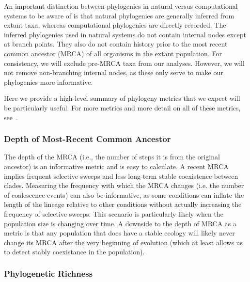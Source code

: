 \documentclass[letterpaper]{article}
\begin{document}
An important distinction between phylogenies in natural versus computational systems to be aware of is that natural phylogenies are generally inferred from extant taxa, whereas computational phylogenies are directly recorded. The inferred phylogenies used in natural systems do not contain internal nodes except at branch points. They also do not contain history prior to the most recent common ancestor (MRCA) of all organisms in the extant population. For consistency, we will exclude pre-MRCA taxa from our analyses. However, we will not remove non-branching internal nodes, as these only serve to make our phylogenies more informative.

Here we provide a high-level summary of phylogeny metrics that we expect will be particularly useful. For more metrics and more detail on all of these metrics, see~\citep{winter_phylogenetic_2013, tucker_guide_2017}. 

\subsubsection{Depth of Most-Recent Common Ancestor}

The depth of the MRCA %
(i.e., the number of steps it is from the original ancestor)
is an informative metric and is easy to calculate.
A recent MRCA implies frequent selective sweeps and less long-term stable coexistence between clades. %
Measuring the frequency with which the MRCA changes (i.e. the number of coalescence events) can also be informative, as some conditions can inflate the length of the lineage relative to other conditions without actually increasing the frequency of selective sweeps. This scenario is particularly likely when the population size is changing over time. A downside to the depth of MRCA as a metric is that any population that does have a stable ecology will likely never change its MRCA after the very beginning of evolution %
(which at least allows us to detect stably coexistance in the population).

\subsubsection{Phylogenetic Richness}
\end{document}
